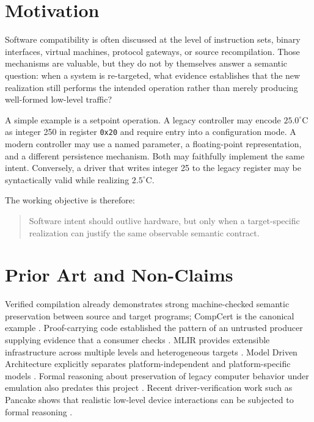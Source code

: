 \documentclass[11pt,a4paper]{article}
\begin{document}
\section{Motivation}

Software compatibility is often discussed at the level of instruction sets,
binary interfaces, virtual machines, protocol gateways, or source recompilation.
Those mechanisms are valuable, but they do not by themselves answer a semantic
question: when a system is re-targeted, what evidence establishes that the new
realization still performs the intended operation rather than merely producing
well-formed low-level traffic?

A simple example is a setpoint operation. A legacy controller may encode
$25.0^\circ$C as integer 250 in register \texttt{0x20} and require entry into
a configuration mode. A modern controller may use a named parameter, a
floating-point representation, and a different persistence mechanism. Both may
faithfully implement the same intent. Conversely, a driver that writes integer
25 to the legacy register may be syntactically valid while realizing
$2.5^\circ$C.

The working objective is therefore:

\begin{quote}
Software intent should outlive hardware, but only when a target-specific
realization can justify the same observable semantic contract.
\end{quote}

\section{Prior Art and Non-Claims}

Verified compilation already demonstrates strong machine-checked semantic
preservation between source and target programs; CompCert is the canonical
example \cite{leroy2009compcert}. Proof-carrying code established the pattern
of an untrusted producer supplying evidence that a consumer checks
\cite{necula1997pcc}. MLIR provides extensible infrastructure across multiple
levels and heterogeneous targets \cite{lattner2020mlir}. Model Driven
Architecture explicitly separates platform-independent and
platform-specific models \cite{omgMDA}. Formal reasoning about preservation
of legacy computer behavior under emulation also predates this project
\cite{fidge2003legacy}. Recent driver-verification work such as Pancake shows
that realistic low-level device interactions can be subjected to formal
reasoning \cite{pancake2025}.
\end{document}
